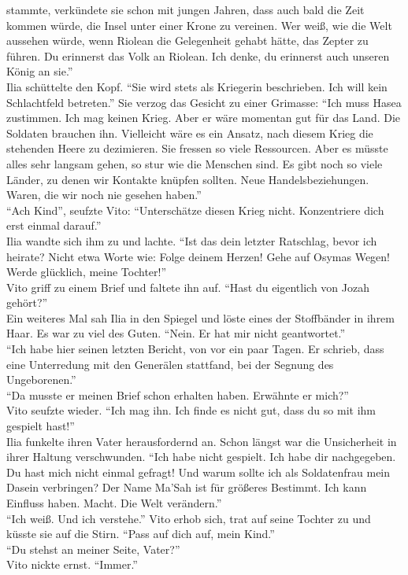stammte, verkündete sie schon mit jungen Jahren, dass auch bald die Zeit kommen würde, die Insel 
unter einer Krone zu vereinen. Wer weiß, wie die Welt aussehen würde, wenn Riolean die Gelegenheit 
gehabt hätte, das Zepter zu führen. Du erinnerst das Volk an Riolean. Ich denke, du erinnerst auch 
unseren König an sie.''\\
Ilia schüttelte den Kopf. ``Sie wird stets als Kriegerin beschrieben. Ich will kein Schlachtfeld 
betreten.'' Sie verzog das Gesicht zu einer Grimasse: ``Ich muss Hasea zustimmen. Ich mag keinen 
Krieg. Aber er wäre momentan gut für das Land. Die Soldaten brauchen ihn. Vielleicht wäre es ein 
Ansatz, nach diesem Krieg die stehenden Heere zu dezimieren. Sie fressen so viele Ressourcen. Aber 
es müsste alles sehr langsam gehen, so stur wie die Menschen sind. Es gibt noch so viele Länder, zu 
denen wir Kontakte knüpfen sollten. Neue Handelsbeziehungen. Waren, die wir noch nie gesehen 
haben.''\\
``Ach Kind'', seufzte Vito: ``Unterschätze diesen Krieg nicht. Konzentriere dich erst einmal 
darauf.''\\
Ilia wandte sich ihm zu und lachte. ``Ist das dein letzter Ratschlag, bevor ich heirate? Nicht 
etwa Worte wie: Folge deinem Herzen! Gehe auf Osymas Wegen! Werde glücklich, meine Tochter!''\\
Vito griff zu einem Brief und faltete ihn auf. ``Hast du eigentlich von Jozah gehört?''\\
Ein weiteres Mal sah Ilia in den Spiegel und löste eines der Stoffbänder in ihrem Haar. 
Es war zu viel des Guten. ``Nein. Er hat mir nicht geantwortet.''\\
``Ich habe hier seinen letzten Bericht, von vor ein paar Tagen. Er schrieb, dass eine 
Unterredung mit den Generälen stattfand, bei der Segnung des Ungeborenen.''\\
``Da musste er meinen Brief schon erhalten haben. Erwähnte er mich?''\\
Vito seufzte wieder. ``Ich mag ihn. Ich finde es nicht gut, dass du so mit ihm gespielt hast!''\\
Ilia funkelte ihren Vater herausfordernd an. Schon längst war die Unsicherheit in ihrer Haltung 
verschwunden. ``Ich habe nicht gespielt. Ich habe dir nachgegeben. Du hast 
mich nicht einmal gefragt! Und warum sollte ich als Soldatenfrau mein Dasein verbringen? Der 
Name Ma'Sah ist für größeres Bestimmt. Ich kann Einfluss haben. Macht. Die Welt verändern.''\\
``Ich weiß. Und ich verstehe.'' Vito erhob sich, trat auf seine Tochter zu und küsste sie auf die 
Stirn. ``Pass auf dich auf, mein Kind.''\\
``Du stehst an meiner Seite, Vater?''\\
Vito nickte ernst. ``Immer.''\\



